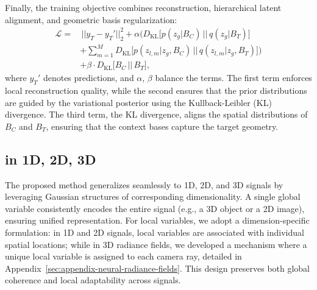 Finally, the training objective combines reconstruction, hierarchical latent alignment, and geometric basis regularization:
\begin{equation}
\begin{aligned}
\mathcal{L} = & \, || {y}_T - {y}_T'||^2_2 + \alpha \Big( D_{\text{KL}}\big[p({z}_g | {B}_C) \,\big|\big|\, q({z}_g | {B}_T)\big] \\
& + \sum_{m=1}^M D_{\text{KL}}\big[p({z}_{l,m} | {z}_g, {B}_C) \,\big|\big|\, q({z}_{l,m} | {z}_g, {B}_T)\big] \Big) \\
& + \beta \cdot D_{\text{KL}}\big[{B}_C \,\big|\big|\, {B}_T\big],
\end{aligned}
\end{equation}
where \( y_T' \) denotes predictions, and \( \alpha \), \( \beta \) balance the terms. 
The first term enforces local reconstruction quality, while the second ensures that the prior distributions 
are guided by the variational posterior using the Kullback-Leibler (KL) divergence. 
The third term, the KL divergence, aligns the spatial distributions of \( B_C \) and \( B_T \), 
ensuring that the context bases capture the target geometry.

\subsection{\name{} in 1D, 2D, 3D}
The proposed method generalizes seamlessly to 1D, 2D, and 3D signals by leveraging Gaussian structures of corresponding dimensionality. A single global variable consistently encodes the entire signal (e.g., a 3D object or a 2D image), ensuring unified representation. For local variables, we adopt a dimension-specific formulation: in 1D and 2D signals, local variables are associated with individual spatial locations; while in 3D radiance fields, we developed a mechanism where a unique local variable is assigned to each camera ray, detailed in {Appendix~\ref{sec:appendix-neural-radiance-fields}}. This design preserves both global coherence and local adaptability across signals. 



